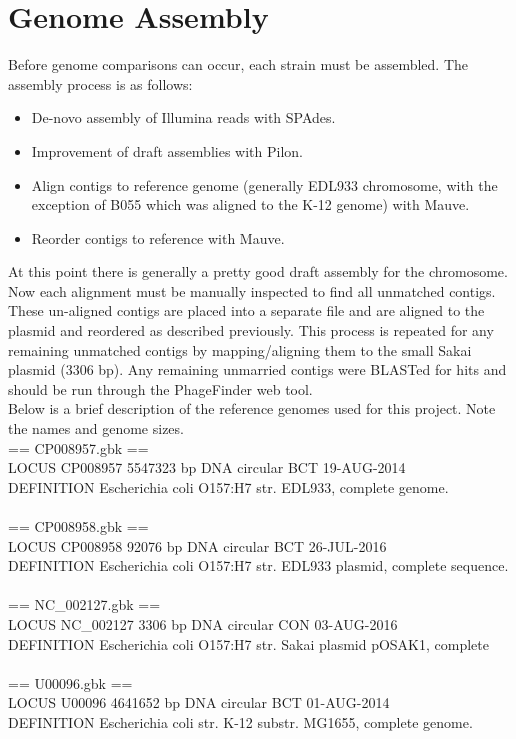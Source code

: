 \documentclass[11pt]{article}
\begin{document}
\section*{Genome Assembly}
Before genome comparisons can occur, each strain must be assembled. The assembly process is as follows: 

\begin{itemize}
\item De-novo assembly of Illumina reads with SPAdes.
\item Improvement of draft assemblies with Pilon.
\item Align contigs to reference genome (generally EDL933 chromosome, with the exception of B055 which was aligned to the K-12 genome) with Mauve.
\item Reorder contigs to reference with Mauve.
\end{itemize}

At this point there is generally a pretty good draft assembly for the chromosome. Now each alignment must be manually inspected to find all unmatched contigs. These un-aligned contigs are placed into a separate file and are aligned to the plasmid and reordered as described previously. This process is repeated for any remaining unmatched contigs by mapping/aligning them to the small Sakai plasmid (3306 bp). Any remaining unmarried contigs were BLASTed for hits and should be run through the PhageFinder web tool. \\

Below is a brief description of the reference genomes used for this project. Note the names and genome sizes. \\

== CP008957.gbk ==   \\
LOCUS       CP008957             5547323 bp    DNA     circular BCT 19-AUG-2014 \\
DEFINITION  Escherichia coli O157:H7 str. EDL933, complete genome. \\
\\
== CP008958.gbk == \\
LOCUS       CP008958               92076 bp    DNA     circular BCT 26-JUL-2016   \\
DEFINITION  Escherichia coli O157:H7 str. EDL933 plasmid, complete sequence.   \\
 \\
== NC\_002127.gbk == \\
LOCUS       NC\_002127               3306 bp    DNA     circular CON 03-AUG-2016   \\
DEFINITION  Escherichia coli O157:H7 str. Sakai plasmid pOSAK1, complete   \\
 \\
== U00096.gbk == \\
LOCUS       U00096               4641652 bp    DNA     circular BCT 01-AUG-2014   \\
DEFINITION  Escherichia coli str. K-12 substr. MG1655, complete genome.   \\
\end{document}

